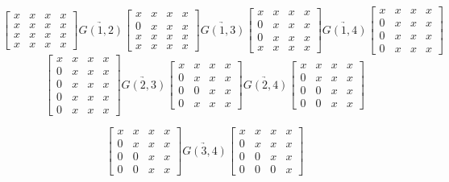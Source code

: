 \documentclass[notheorems]{beamer}
\newcommand{\mx}[1]{{#1}}
\begin{document}
\begin{frame}
\begin{example}
{\scriptsize
$$
\begin{bmatrix}
x & x & x & x \\
x & x & x & x \\
x & x & x & x \\
x & x & x & x   
\end{bmatrix} \underrightarrow{\mx{G}(1,2)} \begin{bmatrix}
x & x & x & x \\
0 & x & x & x \\
x & x & x & x \\
x & x & x & x   
\end{bmatrix} \underrightarrow{\mx{G}(1,3)} \begin{bmatrix}
x & x & x & x \\
0 & x & x & x \\
0 & x & x & x \\
x & x & x & x   
\end{bmatrix} \underrightarrow{\mx{G}(1,4)} \begin{bmatrix}
x & x & x & x \\
0 & x & x & x \\
0 & x & x & x \\
0 & x & x & x   
\end{bmatrix}  
$$
}
$$
\begin{bmatrix}
x & x & x & x \\
0 & x & x & x  \\
0 & x & x & x \\
0 & x & x & x  \\
0 & x & x & x 
\end{bmatrix}  \underrightarrow{\mx{G}(2,3)} \begin{bmatrix}
x & x & x & x \\
0 & x & x & x \\
0 & 0 & x & x \\
0 & x & x & x   
\end{bmatrix} \underrightarrow{\mx{G}(2,4)} \begin{bmatrix}
x & x & x & x \\
0 & x & x & x \\
0 & 0 & x & x \\
0 & 0 & x & x   
\end{bmatrix} 
$$   

$$
\begin{bmatrix}
x & x & x & x \\
0 & x & x & x \\
0 & 0 & x & x \\
0 & 0 & x & x   
\end{bmatrix} \underrightarrow{\mx{G}(3,4)} \begin{bmatrix}
x & x & x & x \\
0 & x & x & x \\
0 & 0 & x & x \\
0 & 0 & 0 & x   
\end{bmatrix} 
$$
\end{example}
\end{frame}
\end{document}
